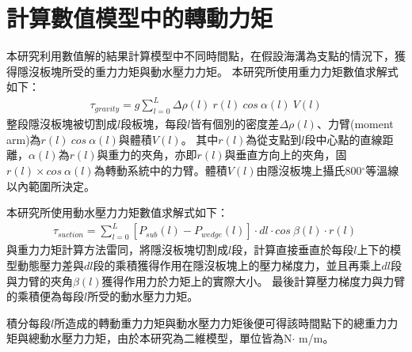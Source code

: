 \section{計算數值模型中的轉動力矩}\label{計算數值模型中的轉動力矩}
本研究利用數值解的結果計算模型中不同時間點，在假設海溝為支點的情況下，獲得隱沒板塊所受的重力力矩與動水壓力力矩。
本研究所使用重力力矩數值求解式如下：
\begin{align}
    \tau_{gravity} =  g\sum ^L_{l=0} \Delta \rho(l)\ r(l)\ cos\ \alpha (l)\ V(l) 
    \label{eqn:tau_gravity}
\end{align}
整段隱沒板塊被切割成$l$段板塊，每段$l$皆有個別的密度差$\Delta \rho(l)$、力臂(moment arm)為$r(l)\ cos\ \alpha (l)$與體積$V(l)$。
其中$r(l)$為從支點到$l$段中心點的直線距離，$ \alpha (l)$為$r(l)$與重力的夾角，亦即$r(l)$與垂直方向上的夾角，固$r(l)\times cos\ \alpha (l)$為轉動系統中的力臂。體積$V(l)$由隱沒板塊上攝氏800$^{\circ}$等溫線以內範圍所決定。

本研究所使用動水壓力力矩數值求解式如下：
\begin{align}
    \tau_{suction} =  \sum ^L_{l=0} [P_{sub}(l)-P_{wedge}(l)]\cdot dl \cdot cos\ \beta(l)\cdot r(l)\ 
    \label{eqn:tau_suction}
\end{align}
與重力力矩計算方法雷同，將隱沒板塊切割成$l$段，計算直接垂直於每段$l$上下的模型動態壓力差與$dl$段的乘積獲得作用在隱沒板塊上的壓力梯度力，並且再乘上$dl$段與力臂的夾角$\beta(l)$獲得作用力於力矩上的實際大小。
最後計算壓力梯度力與力臂的乘積便為每段$l$所受的動水壓力力矩。

積分每段$l$所造成的轉動重力力矩與動水壓力力矩後便可得該時間點下的總重力力矩與總動水壓力力矩，由於本研究為二維模型，單位皆為N$\cdot$ m/m。


